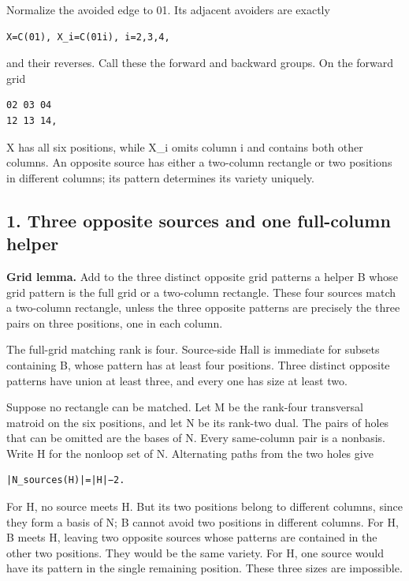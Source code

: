 \documentclass[
  10pt,
]{article}
\begin{document}
Normalize the avoided edge to 01. Its adjacent avoiders are exactly

\begin{verbatim}
X=C(01), X_i=C(01i), i=2,3,4,
\end{verbatim}

and their reverses. Call these the forward and backward groups. On the
forward grid

\begin{verbatim}
02 03 04
12 13 14,
\end{verbatim}

X has all six positions, while X\_i omits column i and contains both
other columns. An opposite source has either a two-column rectangle or
two positions in different columns; its pattern determines its variety
uniquely.

\hypertarget{three-opposite-sources-and-one-full-column-helper}{%
\subsection*{1. Three opposite sources and one full-column
helper}\label{three-opposite-sources-and-one-full-column-helper}}

\textbf{Grid lemma.} Add to the three distinct opposite grid patterns a
helper B whose grid pattern is the full grid or a two-column rectangle.
These four sources match a two-column rectangle, unless the three
opposite patterns are precisely the three pairs on three positions, one
in each column.

The full-grid matching rank is four. Source-side Hall is immediate for
subsets containing B, whose pattern has at least four positions. Three
distinct opposite patterns have union at least three, and every one has
size at least two.

Suppose no rectangle can be matched. Let M be the rank-four transversal
matroid on the six positions, and let N be its rank-two dual. The pairs
of holes that can be omitted are the bases of N. Every same-column pair
is a nonbasis. Write H for the nonloop set of N. Alternating paths from
the two holes give

\begin{verbatim}
|N_sources(H)|=|H|−2.
\end{verbatim}

For \textbar H, no source meets H. But its two positions
belong to different columns, since they form a basis of N; B cannot
avoid two positions in different columns. For \textbar H, B
meets H, leaving two opposite sources whose patterns are contained in
the other two positions. They would be the same variety. For
\textbar H, one source would have its pattern in the single
remaining position. These three sizes are impossible.
\end{document}
